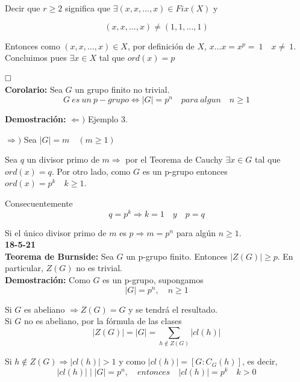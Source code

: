 \documentclass{article}
\begin{document}
Decir que $r\geq 2$ significa que $\exists (x,x,\ldots,x)\in Fix(X)$ y 

\[(x,x,\ldots,x)\neq (1,1,\ldots,1)\]

Entonces como $(x,x,\ldots,x)\in X$, por definición de $X$, $x\ldots x=x^p=~1\quad x\neq~1$. Concluimos pues $\exists x\in X$ tal que $ord(x)=p$

$\hfill\square$\\

\textbf{Corolario:} Sea $G$ un grupo finito no trivial.
\begin{equation*}
G\:es\:un\:p-grupo\Leftrightarrow |G|=p^n\quad para\:algun\quad n\geq 1
\end{equation*}

\textbf{Demostración:} $\Leftarrow)$ Ejemplo 3.

$\Rightarrow)$ Sea $|G|=m\quad (m\geq 1)$

Sea $q$ un divisor primo de $m\Rightarrow$ por el Teorema de Cauchy $\exists x\in G$ tal que $ord(x)=q$. Por otro lado, como $G$ es un p-grupo entonces $ord(x)=p^k\quad k\geq 1$. 

Consecuentemente
\begin{equation*}
q=p^k\Rightarrow k=1\quad y\quad p=q
\end{equation*}

Si el único divisor primo de $m$ es $p\Rightarrow m=p^n$ para algún $n\geq 1$. \\

\textbf{18-5-21} \\

\textbf{Teorema de Burnside:} Sea $G$ un p-grupo finito. Entonces $|Z(G)|\geq p$. En particular, $Z(G)$ no es trivial. \\

\textbf{Demostración:} Como $G$ es un p-grupo, supongamos
\begin{equation*}
|G|=p^n,\quad n\geq 1
\end{equation*}

Si $G$ es abeliano $\Rightarrow Z(G)=G$ y se tendrá el resultado. \\

Si $G$ no es abeliano, por la fórmula de las clases
\begin{equation*}
|Z(G)|=|G|=\sum_{h\notin Z(G)}|cl(h)|
\end{equation*}

Si $h\notin Z(G)\Rightarrow |cl(h)|>1$ y como $|cl(h)|=\left[G:C_G(h)\right]$, es decir,
\begin{equation*}
|cl(h)|\mid |G|=p^n,\quad entonces \quad |cl(h)|=p^k\quad k>0
\end{equation*}
\end{document}
